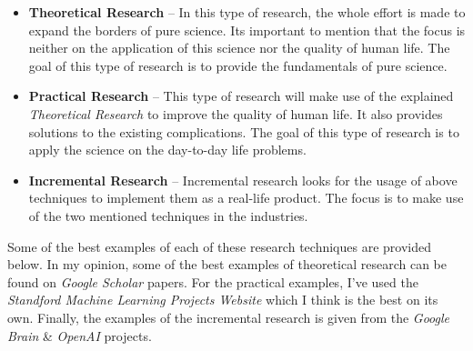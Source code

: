 \documentclass[12pt]{article}
\numberwithin{equation}{section}
\numberwithin{table}{section}
\numberwithin{figure}{section}
\begin{document}
\begin{itemize}
	\item{\textbf{Theoretical Research}} -- In this type of research, the whole effort is made to expand the borders of pure science. Its important to mention that the focus is neither on the application of this science nor the quality of human life. The goal of this type of research is to provide the fundamentals of pure science.
	\item{\textbf{Practical Research}} -- This type of research will make use of the explained \textit{Theoretical Research} to improve the quality of human life. It also provides solutions to the existing complications. The goal of this type of research is to apply the science on the day-to-day life problems.
	\item{\textbf{Incremental Research}} -- Incremental research looks for the usage of above techniques to implement them as a real-life product. The focus is to make use of the two mentioned techniques in the industries.
\end{itemize}

Some of the best examples of each of these research techniques are provided below. In my opinion, some of the best examples of theoretical research can be found on \textit{Google Scholar} papers. For the practical examples, I've used the \textit{Standford Machine Learning Projects Website} which I think is the best on its own. Finally, the examples of the incremental research is given from the \textit{Google Brain} \& \textit{OpenAI} projects.
\end{document}
